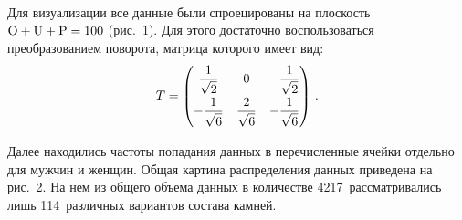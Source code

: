 \begin{multicols}{2}
\begin{figure*}[b]
   \vspace*{1pt}
 \begin{center}
 \mbox{%
 \epsfxsize=161.936mm %
 }
 \end{center}
 \vspace*{-6pt}
   \begin{minipage}[t]{80mm}
\end{minipage}
\hfill
\vspace*{-6pt}
\begin{minipage}[t]{80mm}
\end{minipage}
\end{figure*}

      
      Для визуализации все данные были спроецированы на плоскость 
      $\mathrm{O}\hm+\mathrm{U}\hm+\mathrm{P}\hm=100$ (рис.~1). Для этого 
достаточно воспользоваться преобразованием поворота, матрица которого имеет вид:
      $$
      T=\begin{pmatrix}
      \displaystyle\frac{\displaystyle 1\mathstrut}{\displaystyle \sqrt{2}\mathstrut} & 0 & -\displaystyle\frac{\displaystyle 1\mathstrut}{\displaystyle \sqrt{2}\mathstrut}\\
      -\displaystyle\frac{\displaystyle 1\mathstrut}{\displaystyle \sqrt{6}\mathstrut} & \displaystyle\frac{\displaystyle 2\mathstrut}{\displaystyle \sqrt{6}\mathstrut} & -\displaystyle\frac{\displaystyle 1\mathstrut}{\displaystyle \sqrt{6}\mathstrut}
      \end{pmatrix}\,.
      $$

      Далее находились частоты попадания данных в перечисленные ячейки отдельно для 
мужчин и женщин. Общая картина распределения данных приведена на рис.~2. На нем из 
общего объема данных в количестве 4217~рассматривались лишь 114~различных вариантов 
состава камней.

      \begin{table*}\small %
\begin{center}
\vspace*{2ex}


\end{center}
\end{table*}
\end{multicols}
